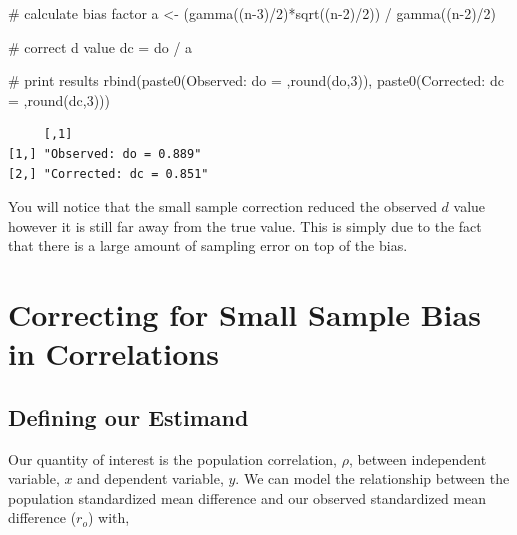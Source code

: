 \documentclass[
  letterpaper,
  DIV=11,
  numbers=noendperiod]{scrreprt}
\newenvironment{Shaded}{\begin{snugshade}}{\end{snugshade}}
\newcommand{\CommentTok}[1]{\textcolor[rgb]{0.37,0.37,0.37}{#1}}
\newcommand{\DecValTok}[1]{\textcolor[rgb]{0.68,0.00,0.00}{#1}}
\newcommand{\FunctionTok}[1]{\textcolor[rgb]{0.28,0.35,0.67}{#1}}
\newcommand{\NormalTok}[1]{\textcolor[rgb]{0.00,0.23,0.31}{#1}}
\newcommand{\OtherTok}[1]{\textcolor[rgb]{0.00,0.23,0.31}{#1}}
\newcommand{\SpecialCharTok}[1]{\textcolor[rgb]{0.37,0.37,0.37}{#1}}
\newcommand{\StringTok}[1]{\textcolor[rgb]{0.13,0.47,0.30}{#1}}
\begin{document}
\begin{Shaded}
\begin{Highlighting}[]
\CommentTok{\# calculate bias factor}
\NormalTok{a }\OtherTok{\textless{}{-}}\NormalTok{ (}\FunctionTok{gamma}\NormalTok{((n}\DecValTok{{-}3}\NormalTok{)}\SpecialCharTok{/}\DecValTok{2}\NormalTok{)}\SpecialCharTok{*}\FunctionTok{sqrt}\NormalTok{((n}\DecValTok{{-}2}\NormalTok{)}\SpecialCharTok{/}\DecValTok{2}\NormalTok{)) }\SpecialCharTok{/} \FunctionTok{gamma}\NormalTok{((n}\DecValTok{{-}2}\NormalTok{)}\SpecialCharTok{/}\DecValTok{2}\NormalTok{) }

\CommentTok{\# correct d value}
\NormalTok{dc }\OtherTok{=}\NormalTok{ do }\SpecialCharTok{/}\NormalTok{ a}

\CommentTok{\# print results}
\FunctionTok{rbind}\NormalTok{(}\FunctionTok{paste0}\NormalTok{(}\StringTok{\textquotesingle{}Observed: do = \textquotesingle{}}\NormalTok{,}\FunctionTok{round}\NormalTok{(do,}\DecValTok{3}\NormalTok{)),}
      \FunctionTok{paste0}\NormalTok{(}\StringTok{\textquotesingle{}Corrected: dc = \textquotesingle{}}\NormalTok{,}\FunctionTok{round}\NormalTok{(dc,}\DecValTok{3}\NormalTok{)))}
\end{Highlighting}
\end{Shaded}

\begin{verbatim}
     [,1]                   
[1,] "Observed: do = 0.889" 
[2,] "Corrected: dc = 0.851"
\end{verbatim}

You will notice that the small sample correction reduced the observed
\(d\) value however it is still far away from the true value. This is
simply due to the fact that there is a large amount of sampling error on
top of the bias.

\hypertarget{correcting-for-small-sample-bias-in-correlations}{%
\section{Correcting for Small Sample Bias in
Correlations}\label{correcting-for-small-sample-bias-in-correlations}}

\hypertarget{defining-our-estimand-1}{%
\subsection{Defining our Estimand}\label{defining-our-estimand-1}}

Our quantity of interest is the population correlation, \(\rho\),
between independent variable, \(x\) and dependent variable, \(y\). We
can model the relationship between the population standardized mean
difference and our observed standardized mean difference (\(r_o\)) with,
\end{document}
